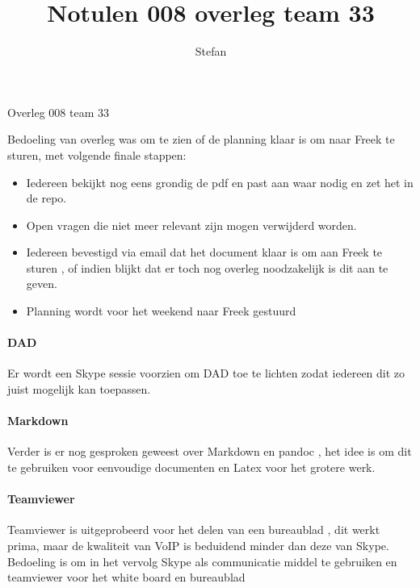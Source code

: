 \documentclass{article}
\title{Notulen 008 overleg team 33}
\author{Stefan}
\begin{document}

\begin{Minutes}{Overleg 008 team 33}

\maketitle%


Bedoeling van overleg was om te zien of de planning klaar is om naar Freek te sturen, met volgende finale stappen:
\begin{itemize}
 \item Iedereen bekijkt nog eens grondig de pdf en past aan waar nodig en zet het in de repo.
 \item Open vragen die niet meer relevant zijn mogen verwijderd worden.
 \item Iedereen bevestigd via email dat het document klaar is om aan Freek te sturen , of indien blijkt dat er toch nog overleg noodzakelijk is dit aan te geven. 
 \item Planning wordt voor het weekend naar Freek gestuurd
\end{itemize}

\paragraph{DAD}
Er wordt een Skype sessie voorzien om DAD toe te lichten zodat iedereen dit zo juist mogelijk kan toepassen.

\paragraph{Markdown}
Verder is er nog gesproken geweest over Markdown en pandoc , het idee is om dit te gebruiken voor eenvoudige documenten en Latex voor het grotere werk.

\paragraph{Teamviewer}
Teamviewer is uitgeprobeerd voor het delen van een bureaublad , dit werkt prima, maar de kwaliteit van VoIP is beduidend minder dan deze van Skype. Bedoeling is om in het vervolg Skype als communicatie middel te gebruiken en teamviewer voor het white board en bureaublad 


\end{Minutes}
\end{document}
